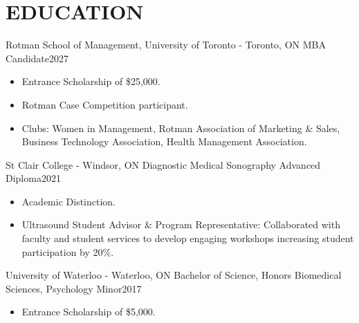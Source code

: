 
\section{\textcolor{airforceblue}{EDUCATION}}
  \employmentSubheadingListStart
    \employmentSubheading
      {Rotman School of Management, University of Toronto - Toronto, ON}{}
      {MBA Candidate}{2027}
      \begin{itemize}[leftmargin=1.5em]
        \item Entrance Scholarship of \$25,000.
        \item Rotman Case Competition participant.
        \item Clubs: Women in Management, Rotman Association of Marketing \& Sales, Business Technology Association, Health Management Association.
      \end{itemize}
    \employmentSubheading
      {St Clair College - Windsor, ON}{}
      {Diagnostic Medical Sonography Advanced Diploma}{2021}
      \begin{itemize}[leftmargin=1.5em]
        \item Academic Distinction.
        \item Ultrasound Student Advisor \& Program Representative: Collaborated with faculty and student services to
develop engaging workshops increasing student participation by 20\%.
      \end{itemize}
    \employmentSubheading
      {University of Waterloo - Waterloo, ON}{}
      {Bachelor of Science, Honors Biomedical Sciences, Psychology Minor}{2017}
      \begin{itemize}[leftmargin=1.5em]
        \item Entrance Scholarship of \$5,000.
      \end{itemize}
  \employmentSubheadingListEnd
  \vspace{-16pt}
